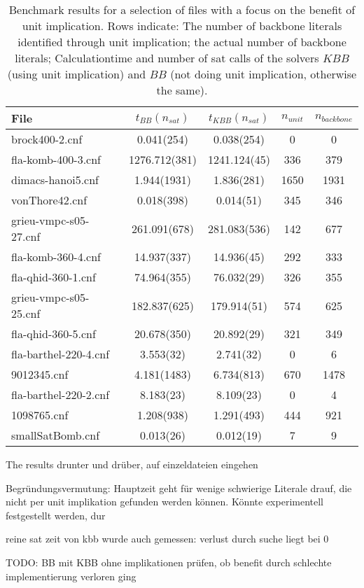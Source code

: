 \begin{table}[h!] %
\begin{tabular}{l| c c c c }
File & $t_{BB}(n_{sat})$ & $t_{KBB}(n_{sat})$ & $n_{unit}$ & $n_{backbone}$  \\
\hline
brock400-2.cnf & 0.041(254) & 0.038(254) & 0 & 0 \\
fla-komb-400-3.cnf & 1276.712(381) & 1241.124(45) & 336 & 379 \\
dimacs-hanoi5.cnf & 1.944(1931) & 1.836(281) & 1650 & 1931 \\
vonThore42.cnf & 0.018(398) & 0.014(51) & 345 & 346 \\
grieu-vmpc-s05-27.cnf & 261.091(678) & 281.083(536) & 142 & 677 \\
fla-komb-360-4.cnf & 14.937(337) & 14.936(45) & 292 & 333 \\
fla-qhid-360-1.cnf & 74.964(355) & 76.032(29) & 326 & 355 \\
grieu-vmpc-s05-25.cnf & 182.837(625) & 179.914(51) & 574 & 625 \\
fla-qhid-360-5.cnf & 20.678(350) & 20.892(29) & 321 & 349 \\
fla-barthel-220-4.cnf & 3.553(32) & 2.741(32) & 0 & 6 \\
9012345.cnf & 4.181(1483) & 6.734(813) & 670 & 1478 \\
fla-barthel-220-2.cnf & 8.183(23) & 8.109(23) & 0 & 4 \\
1098765.cnf & 1.208(938) & 1.291(493) & 444 & 921 \\
smallSatBomb.cnf & 0.013(26) & 0.012(19) & 7 & 9 \\
\end{tabular}
\caption{Benchmark results for a selection of files with a focus on the benefit of unit implication.
Rows indicate: The number of backbone literals identified through unit implication; the actual number of backbone literals; Calculationtime and number of sat calls of the solvers $KBB$ (using unit implication) and $BB$ (not doing unit implication, otherwise the same).}
\label{tab:bbkbb} %
\end{table}



The results drunter und drüber, auf einzeldateien eingehen

Begründungsvermutung: Hauptzeit geht für wenige schwierige Literale drauf, die nicht per unit implikation gefunden werden können. Könnte experimentell festgestellt werden, dur



reine sat zeit von kbb wurde auch gemessen: verlust durch suche liegt bei 0

TODO: BB mit KBB ohne implikationen prüfen, ob benefit durch schlechte implementierung verloren ging
